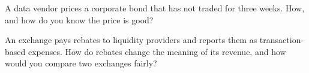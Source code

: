 \begin{interviewq}\label{iq:in:exchanges-brokers-vendors-and-regulators-as-employers:5}
A data vendor prices a corporate bond that has not traded for three weeks. How, and how do you know the price is good?
\end{interviewq}

\begin{interviewq}\label{iq:in:exchanges-brokers-vendors-and-regulators-as-employers:6}
An exchange pays rebates to liquidity providers and reports them as transaction-based expenses. How do rebates change the
meaning of its revenue, and how would you compare two exchanges fairly?
\end{interviewq}
